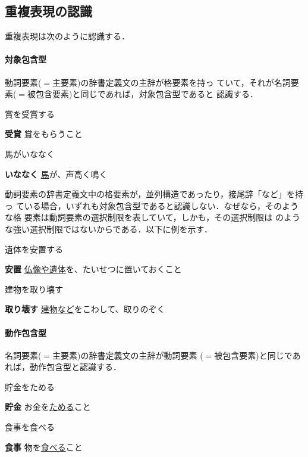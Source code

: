 \documentclass{nlp}
\begin{document}
\subsection{重複表現の認識}
重複表現は次のように認識する．

\paragraph{対象包含型}動詞要素($=$主要素)の辞書定義文の主辞が格要素を持っ
ていて，それが名詞要素($=$被包含要素)と同じであれば，対象包含型であると
認識する．
\begin{example}
 \item 賞を受賞する

 {\bf 受賞} \hspace{10pt}\underline{賞}をもらうこと 
 
 \item 馬がいななく

 {\bf いななく} \hspace{10pt}\underline{馬}が、声高く鳴く 
\end{example}

動詞要素の辞書定義文中の格要素が，並列構造であったり，接尾辞「など」を持っ
ている場合，いずれも対象包含型であると認識しない．なぜなら，そのような格
要素は動詞要素の選択制限を表していて，しかも，その選択制限は
のような強い選択制限ではないからである．以下に例を示す．
\begin{example}
 \item 遺体を安置する

 {\bf 安置} \hspace{10pt}\underline{仏像や遺体}を、たいせつに置いておくこと
 
 \item 建物を取り壊す

 {\bf 取り壊す} \hspace{10pt}\underline{建物など}をこわして、取りのぞく
\end{example}


\paragraph{動作包含型}名詞要素($=$主要素)の辞書定義文の主辞が動詞要素
($=$被包含要素)と同じであれば，動作包含型と認識する．
\begin{example}
 \item 貯金をためる

 {\bf 貯金} \hspace{10pt}お金を\underline{ためる}こと 
 
  \item 食事を食べる

 {\bf 食事} \hspace{10pt}物を\underline{食べる}こと   
\end{example}
\end{document}
